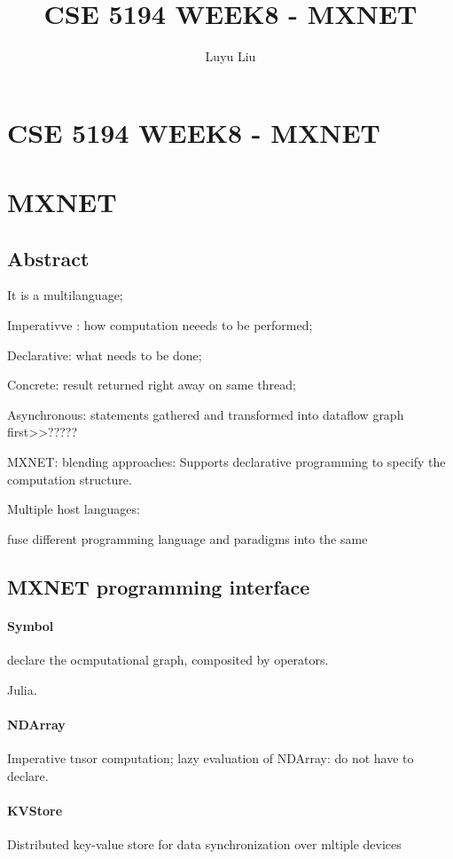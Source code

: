 \documentclass[12pt]{article}
\begin{document}
\author{Luyu Liu}

\newcommand\para{\par\refstepcounter{para}\thepara\space}

\section*{CSE 5194 WEEK8 - MXNET}
\title{CSE 5194 WEEK8 - MXNET}

\section{MXNET}
\subsection{Abstract}
It is a multilanguage;

Imperativve : how computation neeeds to be performed;

Declarative: what needs to be done;

Concrete: result returned right away on same thread;

Asynchronous: statements gathered and transformed into dataflow graph first>>?????

MXNET: blending approaches:
Supports declarative programming to specify the computation structure.

Multiple host languages:

fuse different programming language and paradigms into the same 

\subsection{MXNET programming interface}
\paragraph{Symbol} declare the ocmputational graph, composited by operators.

Julia.


\paragraph{NDArray} Imperative tnsor computation;
lazy evaluation of NDArray: do not have to declare.

\paragraph{KVStore} Distributed key-value store for data synchronization over mltiple devices
\end{document}
